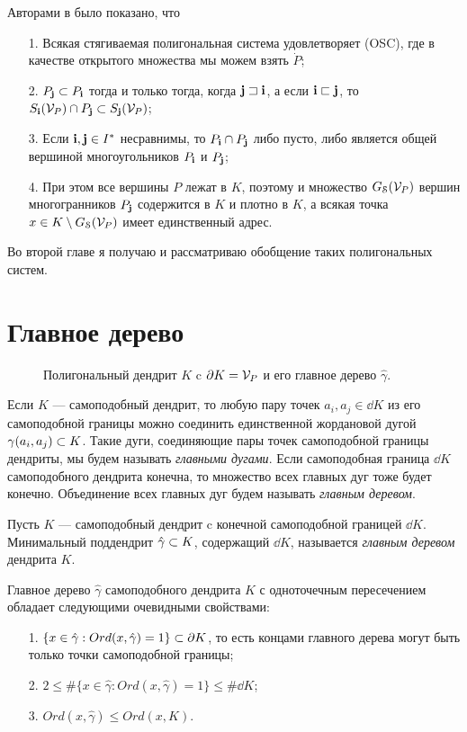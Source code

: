 Авторами в \cite[Theorem 4]{TSV2017} было показано, что
\begin{enumerate}[nolistsep]
\item[1.] Всякая стягиваемая полигональная система удовлетворяет (OSC), где  в качестве открытого множества мы можем взять $\dot P$;
\item[2.] $P_{\bf{j}}\subset P_{\bf{i}}$ тогда и только тогда, когда  ${\bf{j}}\sqsupset{\bf{i}}$, а если ${\bf{i}}\sqsubset{\bf{j}}$, то  $ S_{\bf{i}}({\mathcal V}_P)\cap P_{\bf{j}}\subset S_{\bf{j}}({\mathcal V}_P)$;
\item[3.] Если ${\bf{i}},{\bf{j}}\in I^*$ несравнимы, то $P_{\bf{i}}\cap P_{\bf{j}}$ либо пусто, либо является  общей вершиной многоугольников $P_{\bf{i}}$ и  $P_{\bf{j}}$;
\item[4.] При этом все вершины $P$ лежат в $K$, поэтому и множество $G_{\EuScript S}({\mathcal V}_P)$ вершин многогранников $P_{\bf{j}}$ содержится в $K$ и плотно в $K$, а всякая точка $x\in K\setminus G_{\EuScript S}({\mathcal V}_P)$ имеет единственный адрес.
\end{enumerate}
 
Во второй главе я получаю и рассматриваю обобщение таких полигональных систем.



\section{Главное дерево}

\begin{figure}[H]
\caption{Полигональный дендрит $K$ c $\partial K={\mathcal V}_P$ и его главное дерево $\hat\gamma$. }
\label{fig:penta4plus3}
\end{figure}

Если $K$ --- самоподобный дендрит, то любую пару точек $a_i,a_j\in\dd K$ из его самоподобной границы можно соединить единственной жордановой дугой $\gamma(a_i,a_j)\subset K$.
Такие дуги, соединяющие пары точек самоподобной границы дендриты, мы будем называть {\em главными дугами}.
Если самоподобная граница $\dd K$ самоподобного дендрита конечна, то множество всех главных дуг тоже будет конечно.
Объединение всех главных дуг будем называть {\em главным деревом}.

\begin{definition}\label{dfn:MT}
Пусть $K$ --- самоподобный дендрит c конечной самоподобной границей $\dd K$. 
Минимальный поддендрит $\hat\gamma\subset K$, содержащий $\dd K$, называется {\em главным деревом} дендрита $K$.
\end{definition}

Главное дерево $\hat\gamma$ самоподобного дендрита $K$ с одноточечным пересечением обладает следующими очевидными свойствами:
\begin{enumerate}[nolistsep]
\item[1.] $\{x\in\hat\gamma:Ord(x,\hat\gamma)=1\}\subset\partial K$, то есть концами главного дерева могут быть только точки самоподобной границы;
\item[2.] $2\leq\#\{x\in\hat\gamma:Ord(x,\hat\gamma)=1\}\leq\#\dd K$;
\item[3.] $Ord(x,\hat\gamma)\leq Ord(x,K)$.
\end{enumerate}

